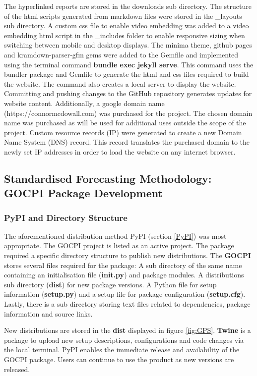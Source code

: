 \documentclass[12pt]{article}
\begin{document}
The hyperlinked reports are stored in the downloads sub directory.
The structure of the html scripts generated from markdown files were stored in the \_layouts sub directory.
A custom css file to enable video embedding was added to a video embedding html script in the \_includes folder to enable responsive sizing when switching between mobile and desktop displays.
The minima theme, github pages and kramdown-parser-gfm gems were added to the Gemfile and implemented using the terminal command \textbf{bundle exec jekyll serve}.
This command uses the bundler package and Gemfile to generate the html and css files required to build the website.
The command also creates a local server to display the website.
Committing and pushing changes to the GitHub repository generates updates for website content.
Additionally, a google domain name (https://connormcdowall.com) was purchased for the project. 
The chosen domain name was purchased as will be used for additional uses outside the scope of the project.
Custom resource records (IP) were generated to create a new Domain Name System (DNS) record. 
This record translates the purchased domain to the newly set IP addresses in order to load the website on any internet browser.

\subsection{Standardised Forecasting Methodology: GOCPI Package Development}
\subsubsection{PyPI and Directory Structure}
The aforementioned distribution method PyPI (section \ref{PyPI}) was most appropriate.
The GOCPI project is listed as an active project.
The package required a specific directory structure to publish new distributions.
The \textbf{GOCPI} stores several files required for the package: 
A sub directory of the same name containing an initialisation file (\textbf{init.py}) and package modules. 
A distributions sub directory (\textbf{dist}) for new package versions. 
A Python file for setup information (\textbf{setup.py}) and a setup file for package configuration (\textbf{setup.cfg}).
Lastly, there is a sub directory storing text files related to dependencies, package information and source links.

New distributions are stored in the \textbf{dist} displayed in figure \ref{fig:GPS}.
\textbf{Twine} is a package to upload new setup descriptions, configurations and code changes via the local terminal.
PyPI enables the immediate release and availability of the GOCPI package.
Users can continue to use the product as new versions are released.
\end{document}
